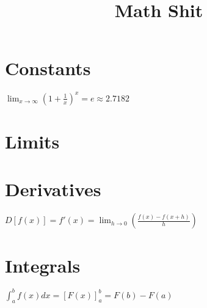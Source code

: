 \documentclass{article}
\begin{document}
\title{Math Shit}
\boldmath

\section{Constants}
$\lim_{x\to\infty}(1+\frac{1}{x})^x=e\approx2.7182$

\section{Limits}

\section{Derivatives}
$D[f(x)] = f'(x) = \lim_{h\to0}(\frac{f(x)-f(x+h)}{h})$

\section{Integrals}
$\int_{a}^{b} f(x) dx = [F(x)]_{a}^{b} = F(b) - F(a)$
\end{document}
